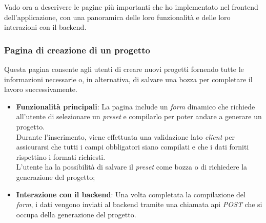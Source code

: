\noindent Vado ora a descrivere le pagine più importanti che ho implementato nel \gls{frontend} dell'applicazione, con una panoramica delle loro funzionalità e delle loro interazioni con il \gls{backend}.

\subsubsection{Pagina di creazione di un progetto}
Questa pagina consente agli utenti di creare nuovi progetti fornendo tutte le informazioni necessarie o, in alternativa, di salvare una bozza per completare il lavoro successivamente. 
\begin{itemize}
    \item \textbf{Funzionalità principali}: La pagina include un \textit{form} dinamico che richiede all'utente di selezionare un \textit{preset} e compilarlo per poter andare a generare un progetto.\\ 
    Durante l'inserimento, viene effettuata una validazione lato \textit{client} per assicurarsi che tutti i campi obbligatori siano compilati e che i dati forniti rispettino i formati richiesti. \\
    L'utente ha la possibilità di salvare il \textit{preset} come bozza o di richiedere la generazione del progetto;
    \item \textbf{Interazione con il \gls{backend}}: Una volta completata la compilazione del \textit{form}, i dati vengono inviati al \gls{backend} tramite una chiamata \gls{api} \textit{POST} che si occupa della generazione del progetto.\\
\end{itemize}

